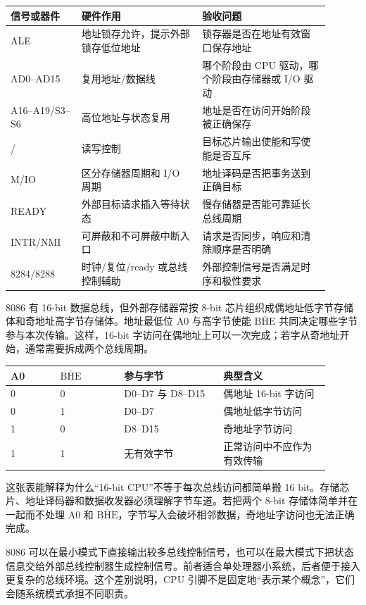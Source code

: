 \begin{longtable}{L{0.2\linewidth}L{0.34\linewidth}L{0.36\linewidth}}
\toprule
信号或器件 & 硬件作用 & 验收问题 \\
\midrule
ALE & 地址锁存允许，提示外部锁存低位地址 & 锁存器是否在地址有效窗口保存地址 \\
AD0--AD15 & 复用地址/数据线 & 哪个阶段由 CPU 驱动，哪个阶段由存储器或 I/O 驱动 \\
A16--A19/S3--S6 & 高位地址与状态复用 & 地址是否在访问开始阶段被正确保存 \\
/ & 读写控制 & 目标芯片输出使能和写使能是否互斥 \\
M/IO & 区分存储器周期和 I/O 周期 & 地址译码是否把事务送到正确目标 \\
READY & 外部目标请求插入等待状态 & 慢存储器是否能可靠延长总线周期 \\
INTR/NMI & 可屏蔽和不可屏蔽中断入口 & 请求是否同步，响应和清除顺序是否明确 \\
8284/8288 & 时钟/复位/ready 或总线控制辅助 & 外部控制信号是否满足时序和极性要求 \\
\bottomrule
\end{longtable}

8086 有 16-bit 数据总线，但外部存储器常按 8-bit 芯片组织成偶地址低字节存储体和奇地址高字节存储体。地址最低位 A0 与高字节使能 $\overline{\mathrm{BHE}}$ 共同决定哪些字节参与本次传输。这样，16-bit 字访问在偶地址上可以一次完成；若字从奇地址开始，通常需要拆成两个总线周期。

\begin{longtable}{L{0.14\linewidth}L{0.18\linewidth}L{0.28\linewidth}L{0.3\linewidth}}
\toprule
A0 & $\overline{\mathrm{BHE}}$ & 参与字节 & 典型含义 \\
 & 0 & D0--D7 与 D8--D15 & 偶地址 16-bit 字访问 \\
0 & 1 & D0--D7 & 偶地址低字节访问 \\
1 & 0 & D8--D15 & 奇地址字节访问 \\
1 & 1 & 无有效字节 & 正常访问中不应作为有效传输 \\
\bottomrule
\end{longtable}

这张表能解释为什么“16-bit CPU”不等于每次总线访问都简单搬 16 bit。存储芯片、地址译码器和数据收发器必须理解字节车道。若把两个 8-bit 存储体简单并在一起而不处理 A0 和 $\overline{\mathrm{BHE}}$，字节写入会破坏相邻数据，奇地址字访问也无法正确完成。

8086 可以在最小模式下直接输出较多总线控制信号，也可以在最大模式下把状态信息交给外部总线控制器生成控制信号。前者适合单处理器小系统，后者便于接入更复杂的总线环境。这个差别说明，CPU 引脚不是固定地“表示某个概念”，它们会随系统模式承担不同职责。

